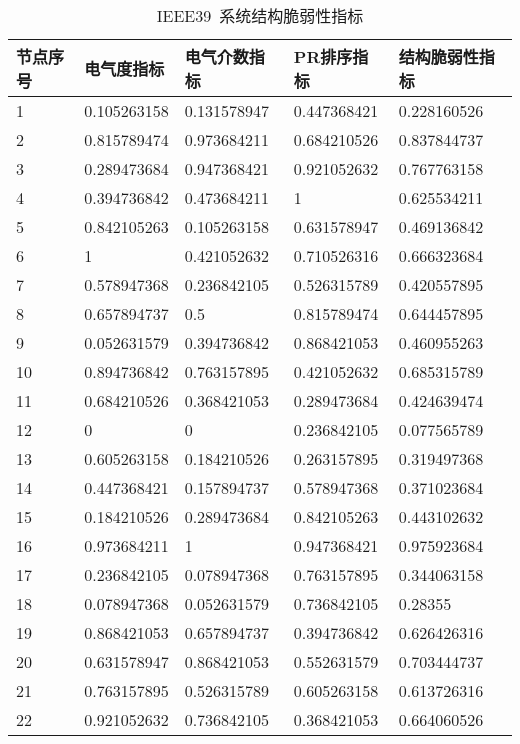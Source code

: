 \begin{table}[H]
\centering
\caption{IEEE39~系统结构脆弱性指标}
\label{tab:chap5:Index_frabric39}
\begin{tabular}{C{1.5cm}C{2.75cm}C{2.75cm}C{2.75cm}C{2.75cm}}
\toprule
\textbf{节点序号} & \textbf{电气度指标} & \textbf{电气介数指标} & \textbf{PR排序指标} & \textbf{结构脆弱性指标} \\
  & 0.105263158 & 0.131578947 & 0.447368421 & 0.228160526 \\
2  & 0.815789474 & 0.973684211 & 0.684210526 & 0.837844737 \\
3  & 0.289473684 & 0.947368421 & 0.921052632 & 0.767763158 \\
4  & 0.394736842 & 0.473684211 & 1           & 0.625534211 \\
5  & 0.842105263 & 0.105263158 & 0.631578947 & 0.469136842 \\
6  & 1           & 0.421052632 & 0.710526316 & 0.666323684 \\
7  & 0.578947368 & 0.236842105 & 0.526315789 & 0.420557895 \\
8  & 0.657894737 & 0.5         & 0.815789474 & 0.644457895 \\
9  & 0.052631579 & 0.394736842 & 0.868421053 & 0.460955263 \\
10 & 0.894736842 & 0.763157895 & 0.421052632 & 0.685315789 \\
11 & 0.684210526 & 0.368421053 & 0.289473684 & 0.424639474 \\
12 & 0           & 0           & 0.236842105 & 0.077565789 \\
13 & 0.605263158 & 0.184210526 & 0.263157895 & 0.319497368 \\
14 & 0.447368421 & 0.157894737 & 0.578947368 & 0.371023684 \\
15 & 0.184210526 & 0.289473684 & 0.842105263 & 0.443102632 \\
16 & 0.973684211 & 1           & 0.947368421 & 0.975923684 \\
17 & 0.236842105 & 0.078947368 & 0.763157895 & 0.344063158 \\
18 & 0.078947368 & 0.052631579 & 0.736842105 & 0.28355     \\
19 & 0.868421053 & 0.657894737 & 0.394736842 & 0.626426316 \\
20 & 0.631578947 & 0.868421053 & 0.552631579 & 0.703444737 \\
21 & 0.763157895 & 0.526315789 & 0.605263158 & 0.613726316 \\
22 & 0.921052632 & 0.736842105 & 0.368421053 & 0.664060526 \\

\end{tabular}
\end{table}
